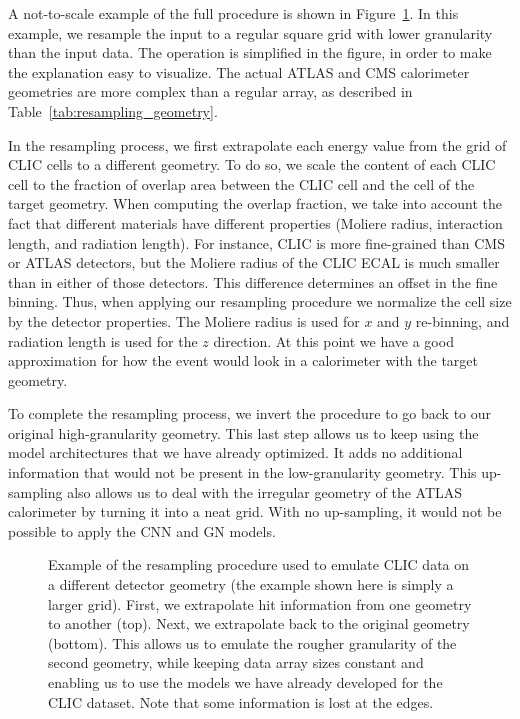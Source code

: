 A not-to-scale example of the full procedure is shown in Figure~\ref{fig:resampling}. In this example, we resample the input to a regular square grid with lower granularity than the input data. The operation is simplified in the figure, in order to make the explanation easy to visualize. The actual ATLAS and CMS calorimeter geometries are more complex than a regular array, as described in Table~\ref{tab:resampling_geometry}.

In the resampling process, we first extrapolate each energy value from the grid of CLIC cells to a different geometry. To do so, we scale the content of each CLIC cell to the fraction of overlap area between the CLIC cell and the cell of the target geometry. When computing the overlap fraction, we take into account the fact that different materials have different properties (Moliere radius, interaction length, and radiation length). For instance, CLIC is more fine-grained than CMS or ATLAS detectors, but the Moliere radius of the CLIC ECAL is much smaller than in either of those detectors. This difference determines an offset in the fine binning. Thus, when applying our resampling procedure we normalize the cell size by the detector properties. The Moliere radius is used for $x$ and $y$ re-binning, and radiation length is used for the $z$ direction. At this point we have a good approximation for how the event would look in a calorimeter with the target geometry.

To complete the resampling process, we invert the procedure to go back to our original high-granularity geometry. This last step allows us to keep using the model architectures that we have already optimized. It adds no additional information that would not be present in the low-granularity geometry. This up-sampling also allows us to deal with the irregular geometry of the ATLAS calorimeter by turning it into a neat grid. With no up-sampling, it would not be possible to apply the CNN and GN models.

\begin{figure}[htbp]
    \centering
    \caption{Example of the resampling procedure used to emulate CLIC data on a different detector geometry (the example shown here is simply a larger grid). First, we extrapolate hit information from one geometry to another (top). Next, we extrapolate back to the original geometry (bottom). This allows us to emulate the rougher granularity of the second geometry, while keeping data array sizes constant and enabling us to use the models we have already developed for the CLIC dataset. Note that some information is lost at the edges.}
    \label{fig:resampling}
\end{figure}

